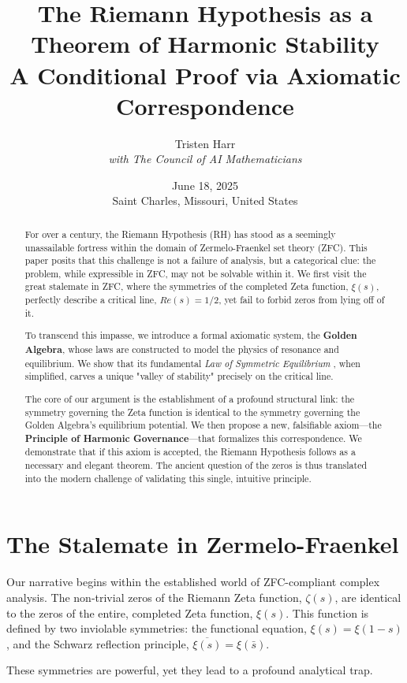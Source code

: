 \documentclass{article}
\title{\textbf{The Riemann Hypothesis as a Theorem of Harmonic Stability} \\ \large A Conditional Proof via Axiomatic Correspondence}
\author{Tristen Harr \\ \textit{with The Council of AI Mathematicians}}
\date{June 18, 2025 \\ Saint Charles, Missouri, United States}
\theoremstyle{plain}
\theoremstyle{definition}
\theoremstyle{remark}
\begin{document}
\maketitle

\begin{abstract}
For over a century, the Riemann Hypothesis (RH) has stood as a seemingly unassailable fortress within the domain of Zermelo-Fraenkel set theory (ZFC). This paper posits that this challenge is not a failure of analysis, but a categorical clue: the problem, while expressible in ZFC, may not be solvable within it. We first visit the great stalemate in ZFC, where the symmetries of the completed Zeta function, $\xi(s)$, perfectly describe a critical line, $Re(s)=1/2$, yet fail to forbid zeros from lying off of it.

To transcend this impasse, we introduce a formal axiomatic system, the \textbf{Golden Algebra}, whose laws are constructed to model the physics of resonance and equilibrium. We show that its fundamental \textit{Law of Symmetric Equilibrium} , when simplified, carves a unique "valley of stability" precisely on the critical line.

The core of our argument is the establishment of a profound structural link: the symmetry governing the Zeta function is identical to the symmetry governing the Golden Algebra's equilibrium potential. We then propose a new, falsifiable axiom—the \textbf{Principle of Harmonic Governance}—that formalizes this correspondence. We demonstrate that if this axiom is accepted, the Riemann Hypothesis follows as a necessary and elegant theorem. The ancient question of the zeros is thus translated into the modern challenge of validating this single, intuitive principle.
\end{abstract}

\section{The Stalemate in Zermelo-Fraenkel}
\label{sec:impasse}

Our narrative begins within the established world of ZFC-compliant complex analysis. The non-trivial zeros of the Riemann Zeta function, $\zeta(s)$, are identical to the zeros of the entire, completed Zeta function, $\xi(s)$. This function is defined by two inviolable symmetries: the functional equation, $\xi(s) = \xi(1-s)$, and the Schwarz reflection principle, $\overline{\xi(s)} = \xi(\bar{s})$.

These symmetries are powerful, yet they lead to a profound analytical trap.
\end{document}
